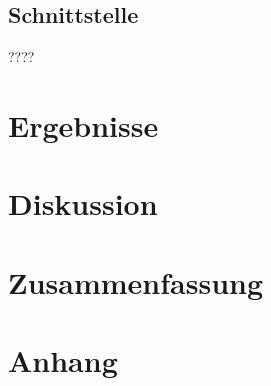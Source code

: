 \documentclass[12pt,a4paper,headinclude,twoside, plainheadsepline, open=right,numbers=noenddot]{scrreprt}
\begin{document}
\section{Schnittstelle}
????

\chapter{Ergebnisse}

\chapter{Diskussion}

\chapter{Zusammenfassung}




\printbibliography


\appendix
\chapter{Anhang}
\end{document}
